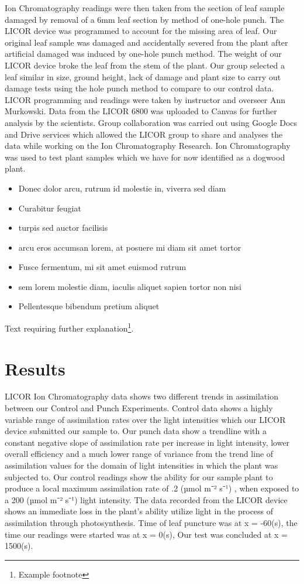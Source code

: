 \documentclass[twoside,twocolumn]{article}
\begin{document}
Ion Chromatography readings were then taken from the section of leaf sample damaged by removal of a 6mm leaf section by method of one-hole punch. The LICOR device was programmed to account for the missing area of leaf. Our original leaf sample was damaged and accidentally severed from the plant after artificial damaged was induced by one-hole punch method. The weight of our LICOR device broke the leaf from the stem of the plant. Our group selected a leaf similar in size, ground height, lack of damage and plant size to carry out damage tests using the hole punch method to compare to our control data.
LICOR programming and readings were taken by instructor and overseer Ann Murkowski. Data from the LICOR 6800 was uploaded to Canvas for further analysis by the scientists. Group collaboration was carried out using Google Docs and Drive services which allowed the LICOR group to share and analyses the data while working on the Ion Chromatography Research. 
Ion Chromatography was used to test plant samples which we have for now identified as a dogwood plant.


\begin{itemize}
\item Donec dolor arcu, rutrum id molestie in, viverra sed diam
\item Curabitur feugiat
\item turpis sed auctor facilisis
\item arcu eros accumsan lorem, at posuere mi diam sit amet tortor
\item Fusce fermentum, mi sit amet euismod rutrum
\item sem lorem molestie diam, iaculis aliquet sapien tortor non nisi
\item Pellentesque bibendum pretium aliquet
\end{itemize}
\blindtext %

Text requiring further explanation\footnote{Example footnote}.


\section{Results}

LICOR Ion Chromatography data shows two different trends in assimilation between our Control and Punch Experiments. Control data shows a highly variable range of assimilation rates over the light intensities which our LICOR device submitted our sample to.  Our punch data show a trendline with a constant negative slope of assimilation rate per increase in light intensity, lower overall efficiency and a much lower range of variance from the trend line of assimilation values for the domain of light intensities in which the plant was subjected to. 
Our control readings show the ability for our sample plant to produce a local maximum assimilation rate of .2 (µmol m⁻² s⁻¹) , when exposed to a 200 (µmol m⁻² s⁻¹) light intensity. The data recorded from the LICOR device shows an immediate loss in the plant’s ability utilize light in the process of assimilation through photosynthesis. Time of leaf puncture was at x = -60(s), the time our readings were started was at x = 0(s), Our test was concluded at x = 1500(s). 
\end{document}
